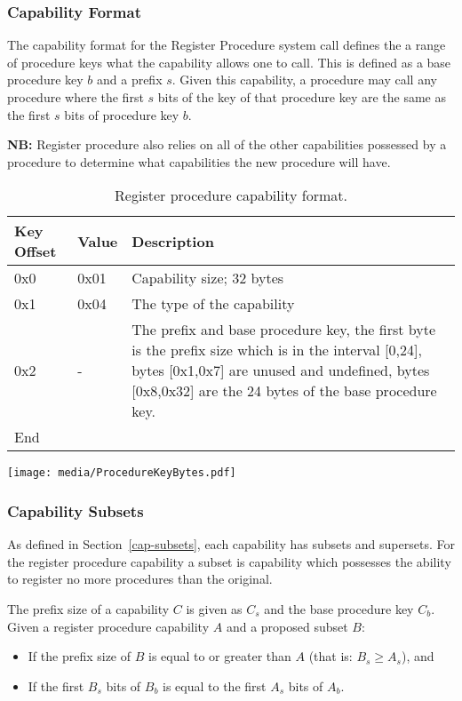 \documentclass[english,a4paper]{article}
\let\oldparagraph\subsubsection
\renewcommand{\subsubsection}[1]{\oldparagraph{#1}\mbox{}}
\begin{document}
\subsubsection{Capability Format}
The capability format for the Register Procedure system call defines the a range
of procedure keys what the capability allows one to call. This is defined as a
base procedure key $b$ and a prefix $s$. Given this capability, a procedure may
call any procedure where the first $s$ bits of the key of that procedure key are
the same as the first $s$ bits of procedure key $b$.

\textbf{NB:} Register procedure also relies on all of the other capabilities
possessed by a procedure to determine what capabilities the new procedure will
have.

\begin{table}[H]
  \caption{Register procedure capability format.}
  \centering{}%
  \begin{tabular}{l|l|p{}}
    \hline
    Key Offset & Value & Description\tabularnewline
    \hline
    \hline
    0x0 & 0x01 & Capability size; 32 bytes \tabularnewline
    0x1 & 0x04 & The type of the capability \tabularnewline
    0x2 & -    & The prefix and base procedure key, the first byte is the prefix
                 size which is in the interval [0,24], bytes [0x1,0x7] are
                 unused and undefined, bytes [0x8,0x32] are the 24 bytes of the
                 base procedure key. \tabularnewline
    \hline
    End &  \tabularnewline
    \hline
  \end{tabular}
\end{table}

\texttt{[image: media/ProcedureKeyBytes.pdf]}

\subsubsection{Capability Subsets}
As defined in Section~\ref{cap-subsets}, each capability has subsets and
supersets. For the register procedure capability a subset is capability which
possesses the ability to register no more procedures than the original.

The prefix size of a capability $C$ is given as $C_s$ and the base procedure key
$C_b$. Given a register procedure capability $A$ and a proposed subset $B$:
\begin{itemize}
  \item If the prefix size of $B$ is equal to or greater than $A$ (that is: $B_s
  \geq A_s$), and
  \item If the first $B_s$ bits of $B_b$ is equal to the first $A_s$ bits of
  $A_b$.
\end{itemize}
\end{document}
